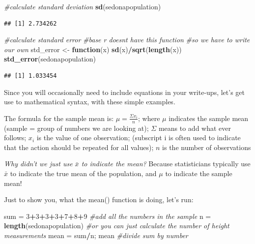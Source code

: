 \documentclass[
]{book}
\newenvironment{Shaded}{\begin{snugshade}}{\end{snugshade}}
\newcommand{\CommentTok}[1]{\textcolor[rgb]{0.56,0.35,0.01}{\textit{#1}}}
\newcommand{\ControlFlowTok}[1]{\textcolor[rgb]{0.13,0.29,0.53}{\textbf{#1}}}
\newcommand{\DecValTok}[1]{\textcolor[rgb]{0.00,0.00,0.81}{#1}}
\newcommand{\FunctionTok}[1]{\textcolor[rgb]{0.13,0.29,0.53}{\textbf{#1}}}
\newcommand{\NormalTok}[1]{#1}
\newcommand{\OtherTok}[1]{\textcolor[rgb]{0.56,0.35,0.01}{#1}}
\newcommand{\SpecialCharTok}[1]{\textcolor[rgb]{0.81,0.36,0.00}{\textbf{#1}}}
\begin{document}
\begin{Shaded}
\begin{Highlighting}[]
\CommentTok{\#calculate standard deviation}
\FunctionTok{sd}\NormalTok{(sedonapopulation)}
\end{Highlighting}
\end{Shaded}

\begin{verbatim}
## [1] 2.734262
\end{verbatim}

\begin{Shaded}
\begin{Highlighting}[]
\CommentTok{\#calculate standard error}
\CommentTok{\#base r doesn\textquotesingle{}t have this function}
\CommentTok{\#so we have to write our own}
\NormalTok{std\_error }\OtherTok{\textless{}{-}} \ControlFlowTok{function}\NormalTok{(x) }\FunctionTok{sd}\NormalTok{(x)}\SpecialCharTok{/}\FunctionTok{sqrt}\NormalTok{(}\FunctionTok{length}\NormalTok{(x))}
\FunctionTok{std\_error}\NormalTok{(sedonapopulation)}
\end{Highlighting}
\end{Shaded}

\begin{verbatim}
## [1] 1.033454
\end{verbatim}

Since you will occasionally need to include equations in your write-ups, let's get use to mathematical syntax, with these simple examples.

The formula for the sample mean is: \(\mu = \frac{\Sigma x_i}{n}\);
where \(\mu\) indicates the sample mean (sample = group of numbers we are looking at);
\(\Sigma\) means to add what ever follows;
\(x_{i}\) is the value of one observation; (subscript i is often used to indicate that the action should be repeated for all values);
\(n\) is the number of observations

\emph{Why didn't we just use \(\bar{x}\) to indicate the mean?}
Because statisticians typically use \(\bar{x}\) to indicate the true mean of the population, and \(\mu\) to indicate the sample mean!

Just to show you, what the mean() function is doing, let's run:

\begin{Shaded}
\begin{Highlighting}[]
\NormalTok{sum }\OtherTok{=} \DecValTok{3}\SpecialCharTok{+}\DecValTok{3}\SpecialCharTok{+}\DecValTok{3}\SpecialCharTok{+}\DecValTok{3}\SpecialCharTok{+}\DecValTok{7}\SpecialCharTok{+}\DecValTok{8}\SpecialCharTok{+}\DecValTok{9} \CommentTok{\#add all the numbers in the sample}
\NormalTok{n }\OtherTok{=} \FunctionTok{length}\NormalTok{(sedonapopulation) }\CommentTok{\#or you can just calculate the number of height measurements}
\NormalTok{mean }\OtherTok{=}\NormalTok{ sum}\SpecialCharTok{/}\NormalTok{n; mean }\CommentTok{\#divide sum by number}
\end{Highlighting}
\end{Shaded}
\end{document}
